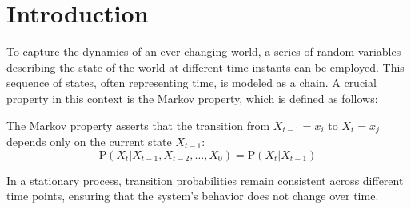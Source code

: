 \section{Introduction}

To capture the dynamics of an ever-changing world, a series of random variables describing the state of the world at different time instants can be employed. 
This sequence of states, often representing time, is modeled as a chain. 
A crucial property in this context is the Markov property, which is defined as follows:
\begin{property}
    The Markov property asserts that the transition from $X_{t-1}=x_i$ to $X_t=x_j$ depends only on the current state $X_{t-1}$: 
    \[\text{P}\left(X_t|X_{t-1},X_{t-2},\dots,X_0\right)=\text{P}(X_t|X_{t-1})\] 
\end{property}
In a stationary process, transition probabilities remain consistent across different time points, ensuring that the system's behavior does not change over time.